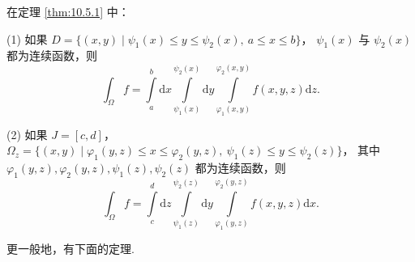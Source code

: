 \begin{theorem}\label{thm:10.5.2}
在定理 \ref{thm:10.5.1} 中：

(1) 如果 $D = \{(x, y) \mid \psi_1(x) \leqslant y \leqslant \psi_2(x),\ a \leqslant x \leqslant b\}$，
$\psi_1(x)$ 与 $\psi_2(x)$ 都为连续函数，则
\[
\int_{\Omega} f = \int \limits_a^b \mathrm{d}x \int \limits_{\psi_1(x)}^{\psi_2(x)} \mathrm{d}y
  \int \limits_{\varphi_1(x, y)}^{\varphi_2(x, y)} f(x, y, z) \mathrm{d}z.
\]

(2) 如果 $J = [c, d]$，
$\Omega_z = \{(x, y) \mid \varphi_1(y, z) \leqslant x \leqslant \varphi_2(y, z),\
\psi_1(z) \leqslant y \leqslant \psi_2(z)\}$，
其中 $\varphi_1(y, z), \varphi_2(y, z), \psi_1(z), \psi_2(z)$ 都为连续函数，则
\[
\int_{\Omega} f = \int \limits_c^d \mathrm{d}z \int \limits_{\psi_1(z)}^{\psi_2(z)} \mathrm{d}y
  \int \limits_{\varphi_1(y, z)}^{\varphi_2(y, z)} f(x, y, z) \mathrm{d}x.
\]
\end{theorem}

更一般地，有下面的定理.


